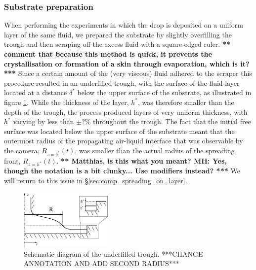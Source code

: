 \documentclass[aip,graphicx]{revtex4-1}
\begin{document}
\subsubsection{Substrate preparation\label{sec:creating_layer}}
When performing the experiments in which the drop is 
deposited on a uniform layer of the same fluid, we prepared the
substrate by slightly overfilling the trough and then scraping
off the excess fluid with a square-edged ruler.  {\bf  *** comment that because this method is quick, it prevents the crystallisation or formation of a skin through evaporation, which is it? ***} Since a certain amount of the (very viscous) fluid 
adhered to the scraper this procedure resulted in an underfilled trough, 
with the surface of the fluid layer located at a distance $\delta^*$ 
below the upper surface of the substrate, as illustrated in figure 
\ref{fig:axisym_drop_nozzle_gap}. While the thickness of the layer, 
$h^*$, was therefore smaller than the depth of the trough, the
process produced layers of very uniform thickness, with
$h^*$ varying by less than {\bf $\pm ?\%$} throughout the trough. 
The fact that the initial free surface was located below the
upper surface of the substrate meant that the outermost radius
of the propagating air-liquid interface that was observable by the camera,
$R_{z=\delta^*}(t)$, was smaller than the actual radius of the spreading front,
 $R_{z=h^*}(t)$. {\bf *** Matthias, is this what you meant? MH: Yes,
  though the notation is a bit clunky... Use modifiers instead? ***} 
We will return to this issue in \S \ref{sec:comp_spreading_on_layer}.

\begin{figure}[!ht]
\centering
\includegraphics[width=0.4\textwidth]{figures/axisym_drop_nozzle_gap.eps}
\caption{Schematic diagram of the underfilled trough. ***CHANGE
  ANNOTATION AND ADD SECOND RADIUS***}
\label{fig:axisym_drop_nozzle_gap}
\end{figure}
 
\end{document}
